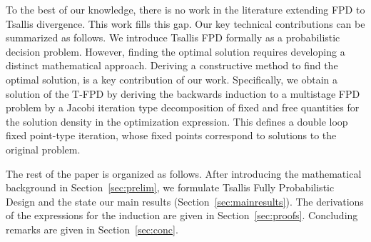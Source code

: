 \documentclass[a4paper,fleqn]{cas-sc}
\begin{document}


 To the best of our knowledge, there is no work in the literature extending FPD to Tsallis divergence. This work fills this gap. Our key technical contributions can be summarized as follows. We introduce Tsallis FPD formally as a probabilistic decision problem. However, finding the optimal solution requires developing a distinct mathematical approach. Deriving a constructive method to find the optimal solution, is a key contribution of our work. Specifically, we obtain a solution of the T-FPD by deriving the backwards induction to a multistage FPD problem by a Jacobi iteration type decomposition of fixed and free quantities for the solution density in the optimization expression. This defines a double loop fixed point-type iteration, whose fixed points correspond to solutions to the original problem. 

The rest of the paper is organized as follows. After introducing the mathematical background in Section~\ref{sec:prelim}, we formulate Tsallis Fully Probabilistic Design and the state our main results  (Section~\ref{sec:mainresults}). The derivations of the expressions for the induction are given in Section~\ref{sec:proofs}. Concluding remarks are given in Section~\ref{sec:conc}. 
\end{document}
